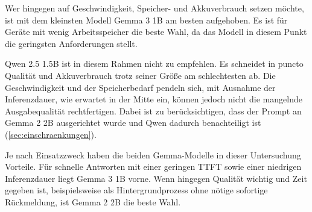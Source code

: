 \noindent Wer hingegen auf Geschwindigkeit, Speicher- und Akkuverbrauch setzen möchte, ist mit dem kleinsten Modell Gemma 3 1B am besten aufgehoben. Es ist für Geräte mit wenig Arbeitsspeicher die beste Wahl, da das Modell in diesem Punkt die geringsten Anforderungen stellt.
\vspace{\baselineskip}

\noindent Qwen 2.5 1.5B ist in diesem Rahmen nicht zu empfehlen. Es schneidet in puncto Qualität und Akkuverbrauch trotz seiner Größe am schlechtesten ab. Die Geschwindigkeit und der Speicherbedarf pendeln sich, mit Ausnahme der Inferenzdauer, wie erwartet in der Mitte ein, können jedoch nicht die mangelnde Ausgabequalität rechtfertigen. Dabei ist zu berücksichtigen, dass der Prompt an Gemma 2 2B ausgerichtet wurde und Qwen dadurch benachteiligt ist (\autoref{sec:einschraenkungen}).
\vspace{\baselineskip}

\noindent Je nach Einsatzzweck haben die beiden Gemma-Modelle in dieser Untersuchung Vorteile. Für schnelle Antworten mit einer geringen \ac{TTFT} sowie einer niedrigen Inferenzdauer liegt Gemma 3 1B vorne. Wenn hingegen Qualität wichtig und Zeit gegeben ist, beispielsweise als Hintergrundprozess ohne nötige sofortige Rückmeldung, ist Gemma 2 2B die beste Wahl.